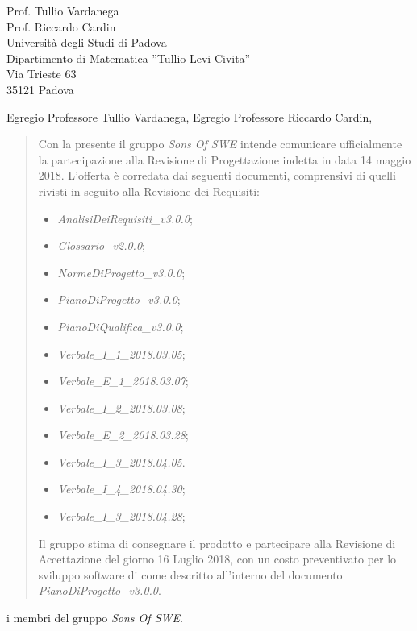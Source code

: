 \documentclass{letter}
\newcommand{\gruppo}{\emph{Sons Of SWE}}
\newcommand{\AdR}{\emph{AnalisiDeiRequisiti\_v3.0.0}}
\newcommand{\NdP}{\emph{NormeDiProgetto\_v3.0.0}}
\newcommand{\PdP}{\emph{PianoDiProgetto\_v3.0.0}}
\newcommand{\PdQ}{\emph{PianoDiQualifica\_v3.0.0}}
\newcommand{\G}{\emph{Glossario\_v2.0.0}}
\newcommand{\VIuno}{\emph{Verbale\_I\_1\_2018.03.05}}
\newcommand{\VEuno}{\emph{Verbale\_E\_1\_2018.03.07}}
\newcommand{\VIdue}{\emph{Verbale\_I\_2\_2018.03.08}}
\newcommand{\VEdue}{\emph{Verbale\_E\_2\_2018.03.28}}
\newcommand{\VItre}{\emph{Verbale\_I\_3\_2018.04.05}}
\newcommand{\VIquattro}{\emph{Verbale\_I\_4\_2018.04.30}}
\newcommand{\VEtre}{\emph{Verbale\_I\_3\_2018.04.28}}
\begin{document}
	
\begin{letter} {   
	\hfill Prof. Tullio Vardanega\\
	\hfill Prof. Riccardo Cardin\\
	\hfill Università degli Studi di Padova \\
	\hfill Dipartimento di Matematica ''Tullio Levi Civita'' \\
	\hfill Via Trieste 63 \\
	\hfill 35121 Padova \\
}

\date{}
\opening{Egregio Professore Tullio Vardanega, \newline Egregio Professore Riccardo Cardin,}
	\begin{quotation}
	
\noindent Con la presente il gruppo \textit{\gruppo} intende comunicare ufficialmente la partecipazione alla Revisione di Progettazione indetta in data 14 maggio 2018.
L’offerta è corredata dai seguenti documenti, comprensivi di quelli rivisti in seguito alla Revisione dei Requisiti:
		\begin{itemize}
			\item \AdR{};
			\item \G{};
			\item \NdP{};
			\item \PdP{};
			\item \PdQ{};
			\item \VIuno{};
			\item \VEuno{};
			\item \VIdue{};
			\item \VEdue{};
			\item \VItre{}.
			\item \VIquattro{};
			\item \VEtre{};
		\end{itemize}
		Il gruppo stima di consegnare il prodotto e partecipare alla Revisione di Accettazione del giorno 16 Luglio 2018, con un costo preventivato per lo sviluppo software di  come descritto all’interno del documento \PdP{}.
	\end{quotation}
{
	\setlength\parindent{24pt}
	\indent i membri del gruppo \gruppo.
}
\end{letter}
\end{document}
